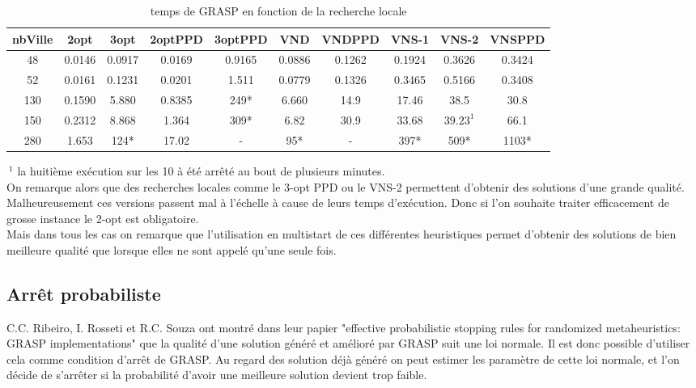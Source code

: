 \documentclass[12pt,a4paper]{article}
\begin{document}
\begin{table}[!h]
\leftskip -1.1cm
{
\begin{tabular}{|*{10}{c|}}
  \hline
  nbVille & 2opt & 3opt & 2optPPD & 3optPPD & VND & VNDPPD & VNS-1 & VNS-2 & VNSPPD \\
  \hline
  48 & 0.0146 & 0.0917 & 0.0169 & 0.9165 & 0.0886 & 0.1262 & 0.1924 & 0.3626 & 0.3424 \\ 
  52 & 0.0161 & 0.1231 & 0.0201 & 1.511 & 0.0779 & 0.1326 & 0.3465 & 0.5166 & 0.3408 \\
  130 & 0.1590 & 5.880 & 0.8385 & 249* & 6.660 & 14.9 & 17.46 & 38.5 & 30.8 \\
  150 & 0.2312 & 8.868 & 1.364 & 309* & 6.82 & 30.9 & 33.68 & $39.23^1$ & 66.1 \\  
  280 & 1.653 & 124* & 17.02 & - & 95* & - & 397* & 509* & 1103* \\
  \hline
\end{tabular}
}
\caption{temps de GRASP en fonction de la recherche locale}
\label{recherchelocaleGRASPtemps}
\end{table}
$~^1$ la huitième exécution sur les 10 à été arrêté au bout de plusieurs minutes.\\

On remarque alors que des recherches locales comme le 3-opt PPD ou le VNS-2 permettent d'obtenir des solutions d'une grande qualité. Malheureusement ces versions passent mal à l’échelle à cause de leurs temps d’exécution. Donc si l'on souhaite traiter efficacement de grosse instance le 2-opt est obligatoire.\\

Mais dans tous les cas on remarque que l'utilisation en multistart de ces différentes heuristiques permet d'obtenir des solutions de bien meilleure qualité que lorsque elles ne sont appelé qu'une seule fois.\\

\subsection{Arrêt probabiliste}

C.C. Ribeiro, I. Rosseti et R.C. Souza ont montré dans leur papier "effective probabilistic stopping rules for randomized metaheuristics: GRASP implementations" que la qualité d'une solution généré et amélioré par GRASP suit une loi normale. Il est donc possible d'utiliser cela comme condition d’arrêt de GRASP. Au regard des solution déjà généré on peut estimer les paramètre de cette loi normale, et l'on décide de s’arrêter si la probabilité d'avoir une meilleure solution devient trop faible.\\
\end{document}
